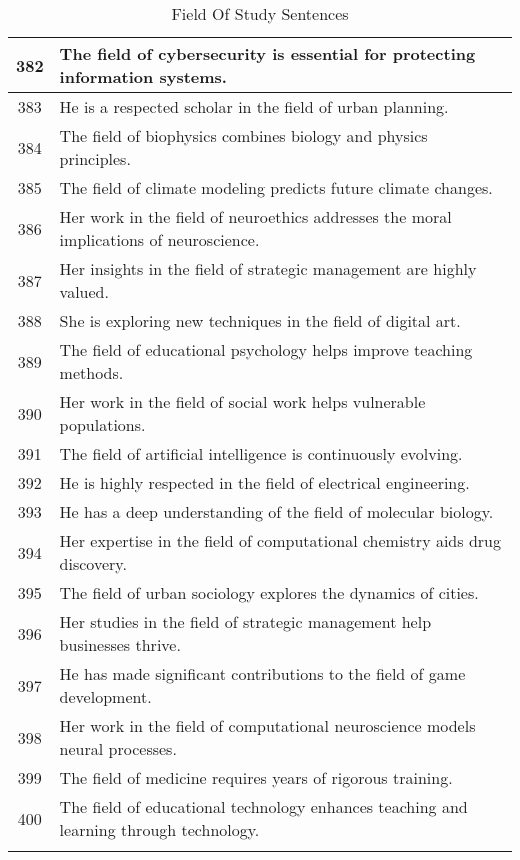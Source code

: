 \begin{longtable}{|c|p{12cm}|}
382 & The field of cybersecurity is essential for protecting information systems. \\ \hline
383 & He is a respected scholar in the field of urban planning. \\ \hline
384 & The field of biophysics combines biology and physics principles. \\ \hline
385 & The field of climate modeling predicts future climate changes. \\ \hline
386 & Her work in the field of neuroethics addresses the moral implications of neuroscience. \\ \hline
387 & Her insights in the field of strategic management are highly valued. \\ \hline
388 & She is exploring new techniques in the field of digital art. \\ \hline
389 & The field of educational psychology helps improve teaching methods. \\ \hline
390 & Her work in the field of social work helps vulnerable populations. \\ \hline
391 & The field of artificial intelligence is continuously evolving. \\ \hline
392 & He is highly respected in the field of electrical engineering. \\ \hline
393 & He has a deep understanding of the field of molecular biology. \\ \hline
394 & Her expertise in the field of computational chemistry aids drug discovery. \\ \hline
395 & The field of urban sociology explores the dynamics of cities. \\ \hline
396 & Her studies in the field of strategic management help businesses thrive. \\ \hline
397 & He has made significant contributions to the field of game development. \\ \hline
398 & Her work in the field of computational neuroscience models neural processes. \\ \hline
399 & The field of medicine requires years of rigorous training. \\ \hline
400 & The field of educational technology enhances teaching and learning through technology. \\ \hline

    \caption{Field Of Study Sentences}
    \label{tab:field_study}
    \end{longtable}
    